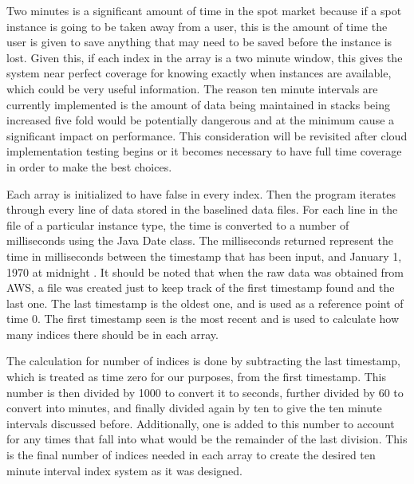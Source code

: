 \documentclass[thesis,proposal]{umassthesis}  %
\begin{document}
Two minutes is a significant amount of time in the spot market because if a spot instance is going to be taken away from a user, this is the amount of time the user is given to save anything that may need to be saved before the instance is lost. Given this, if each index in the array is a two minute window, this gives the system near perfect coverage for knowing exactly when instances are available, which could be very useful information. The reason ten minute intervals are currently implemented is the amount of data being maintained in stacks being increased five fold would be potentially dangerous and at the minimum cause a significant impact on performance. This consideration will be revisited after cloud implementation testing begins or it becomes necessary to have full time coverage in order to make the best choices.\par

Each array is initialized to have false in every index. Then the program iterates through every line of data stored in the baselined data files. For each line in the file of a particular instance type, the time is converted to a number of milliseconds using the Java Date class. The milliseconds returned represent the time in milliseconds between the timestamp that has been input, and January 1, 1970 at midnight \cite{javaDateInfo}. It should be noted that when the raw data was obtained from AWS, a file was created just to keep track of the first timestamp found and the last one. The last timestamp is the oldest one, and is used as a reference point of time 0. The first timestamp seen is the most recent and is used to calculate how many indices there should be in each array.\par

The calculation for number of indices is done by subtracting the last timestamp, which is treated as time zero for our purposes, from the first timestamp. This number is then divided by 1000 to convert it to seconds, further divided by 60 to convert into minutes, and finally divided again by ten to give the ten minute intervals discussed before. Additionally, one is added to this number to account for any times that fall into what would be the remainder of the last division. This is the final number of indices needed in each array to create the desired ten minute interval index system as it was designed.\par
\end{document}
